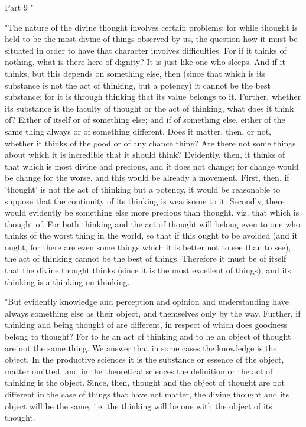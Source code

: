 Part 9 "

"The nature of the divine thought involves certain problems; for while
thought is held to be the most divine of things observed by us, the
question how it must be situated in order to have that character involves
difficulties. For if it thinks of nothing, what is there here of dignity?
It is just like one who sleeps. And if it thinks, but this depends
on something else, then (since that which is its substance is not
the act of thinking, but a potency) it cannot be the best substance;
for it is through thinking that its value belongs to it. Further,
whether its substance is the faculty of thought or the act of thinking,
what does it think of? Either of itself or of something else; and
if of something else, either of the same thing always or of something
different. Does it matter, then, or not, whether it thinks of the
good or of any chance thing? Are there not some things about which
it is incredible that it should think? Evidently, then, it thinks
of that which is most divine and precious, and it does not change;
for change would be change for the worse, and this would be already
a movement. First, then, if 'thought' is not the act of thinking but
a potency, it would be reasonable to suppose that the continuity of
its thinking is wearisome to it. Secondly, there would evidently be
something else more precious than thought, viz. that which is thought
of. For both thinking and the act of thought will belong even to one
who thinks of the worst thing in the world, so that if this ought
to be avoided (and it ought, for there are even some things which
it is better not to see than to see), the act of thinking cannot be
the best of things. Therefore it must be of itself that the divine
thought thinks (since it is the most excellent of things), and its
thinking is a thinking on thinking. 

"But evidently knowledge and perception and opinion and understanding
have always something else as their object, and themselves only by
the way. Further, if thinking and being thought of are different,
in respect of which does goodness belong to thought? For to he an
act of thinking and to he an object of thought are not the same thing.
We answer that in some cases the knowledge is the object. In the productive
sciences it is the substance or essence of the object, matter omitted,
and in the theoretical sciences the definition or the act of thinking
is the object. Since, then, thought and the object of thought are
not different in the case of things that have not matter, the divine
thought and its object will be the same, i.e. the thinking will be
one with the object of its thought. 

